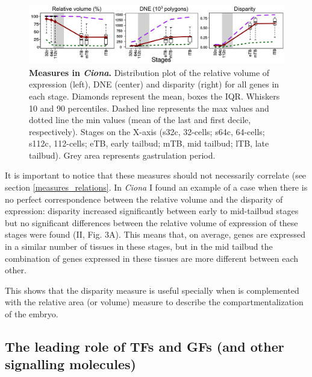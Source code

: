 \begin{figure}[b]
  \includegraphics[width=\textwidth]{./Images/Art-II/3_measures_nostars.png}
  \centering
  \caption{\textbf{Measures in \textit{Ciona}.} Distribution plot of the relative volume of expression (left), DNE (center) and disparity (right) for all genes in each stage. Diamonds represent the mean, boxes the IQR. Whiskers 10 and 90 percentiles. Dashed line represents the max values and dotted line the min values (mean of the last and first decile, respectively). Stages on the X-axis (s32c, 32-cells; s64c, 64-cells; s112c, 112-cells; eTB, early tailbud; mTB, mid tailbud; lTB, late tailbud). Grey area represents gastrulation period.}
  \label{fig:Art-II-3measures}
\end{figure}

It is important to notice that these measures should not necessarily correlate (see section \ref{measures_relations}.
%
In \textit{Ciona} I found an example of a case when there is no perfect correspondence between the relative volume and the disparity of expression: disparity increased significantly between early to mid-tailbud stages but no significant differences between the relative volume of expression of these stages were found (II, Fig. 3A).
This means that, on average, genes are expressed in a similar number of tissues in these stages, but in the mid tailbud the combination of genes expressed in these tissues are more different between each other.

This shows that the disparity measure is useful specially when is complemented with the relative area (or volume) measure to describe the compartmentalization of the embryo.


\subsection{The leading role of TFs and GFs (and other signalling molecules)}

